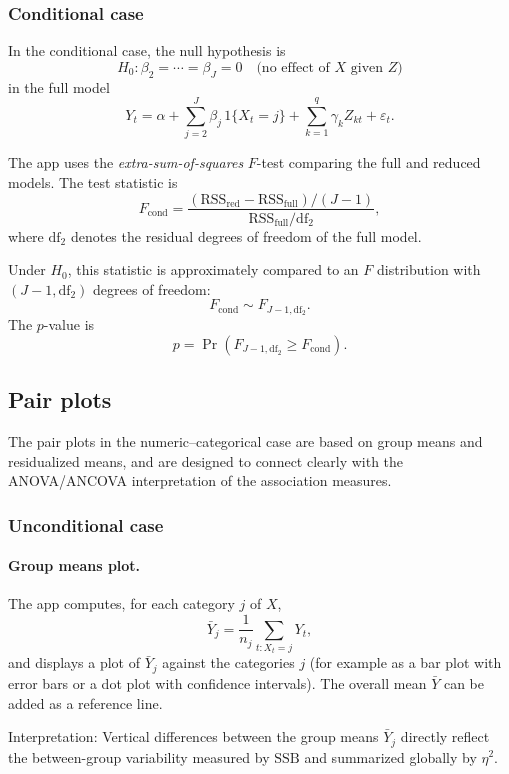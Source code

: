 \documentclass[11pt,a4paper]{article}
\begin{document}
\subsubsection*{Conditional case}

In the conditional case, the null hypothesis is
\[
  H_0: \beta_2 = \cdots = \beta_J = 0 \quad \text{(no effect of $X$ given $Z$)}
\]
in the full model
\[
  Y_t = \alpha + \sum_{j=2}^J \beta_j \, 1\{X_t = j\} + \sum_{k=1}^q \gamma_k Z_{kt} + \varepsilon_t.
\]

The app uses the \emph{extra-sum-of-squares} $F$-test comparing the full and reduced models. The test statistic is
\[
  F_{\text{cond}}
  =
  \frac{\left(\mathrm{RSS}_{\text{red}} - \mathrm{RSS}_{\text{full}}\right)/(J-1)}
  {\mathrm{RSS}_{\text{full}}/\mathrm{df}_2},
\]
where $\mathrm{df}_2$ denotes the residual degrees of freedom of the full model.

Under $H_0$, this statistic is approximately compared to an $F$ distribution with $(J-1, \mathrm{df}_2)$ degrees of freedom:
\[
  F_{\text{cond}} \sim F_{J-1, \mathrm{df}_2}.
\]
The $p$-value is
\[
  p = \Pr\left( F_{J-1, \mathrm{df}_2} \ge F_{\text{cond}} \right).
\]

\subsection{Pair plots}

The pair plots in the numeric--categorical case are based on group means and residualized means, and are designed to connect clearly with the ANOVA/ANCOVA interpretation of the association measures.

\subsubsection*{Unconditional case}

\paragraph{Group means plot.} The app computes, for each category $j$ of $X$,
\[
  \bar{Y}_j = \frac{1}{n_j} \sum_{t: X_t=j} Y_t,
\]
and displays a plot of $\bar{Y}_j$ against the categories $j$ (for example as a bar plot with error bars or a dot plot with confidence intervals). The overall mean $\bar{Y}$ can be added as a reference line.

Interpretation: Vertical differences between the group means $\bar{Y}_j$ directly reflect the between-group variability measured by $\mathrm{SSB}$ and summarized globally by $\eta^2$.
\end{document}
